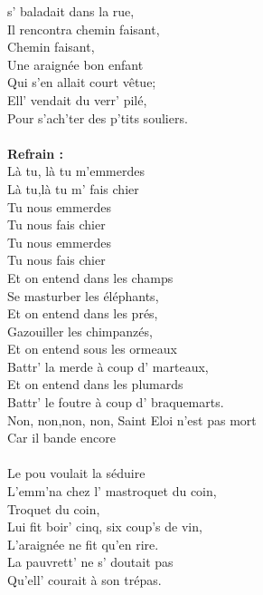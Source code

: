 
 s' baladait dans la rue,
\\Il rencontra chemin faisant,
\\Chemin faisant,
\\Une araignée bon enfant
\\Qui s'en allait court vêtue;
\\Ell' vendait du verr' pilé,
\\Pour s'ach'ter des p'tits souliers.
\\\\\textbf{Refrain :}
\\Là tu, là tu m'emmerdes
\\Là tu,là tu m' fais chier
\\Tu nous emmerdes
\\Tu nous fais chier
\\Tu nous emmerdes
\\Tu nous fais chier
\\Et on entend dans les champs
\\Se masturber les éléphants,
\\Et on entend dans les prés,
\\Gazouiller les chimpanzés,
\\Et on entend sous les ormeaux
\\Battr' la merde à coup d' marteaux,
\\Et on entend dans les plumards
\\Battr' le foutre à coup d' braquemarts.
\\Non, non,non, non, Saint Eloi n'est pas mort \bissimple
\\Car il bande encore \bissimple
\\\\Le pou voulait la séduire
\\L'emm'na chez l' mastroquet du coin,
\\Troquet du coin,
\\Lui fit boir' cinq, six coup's de vin,
\\L'araignée ne fit qu'en rire.
\\La pauvrett' ne s' doutait pas
\\Qu'ell' courait à son trépas.
